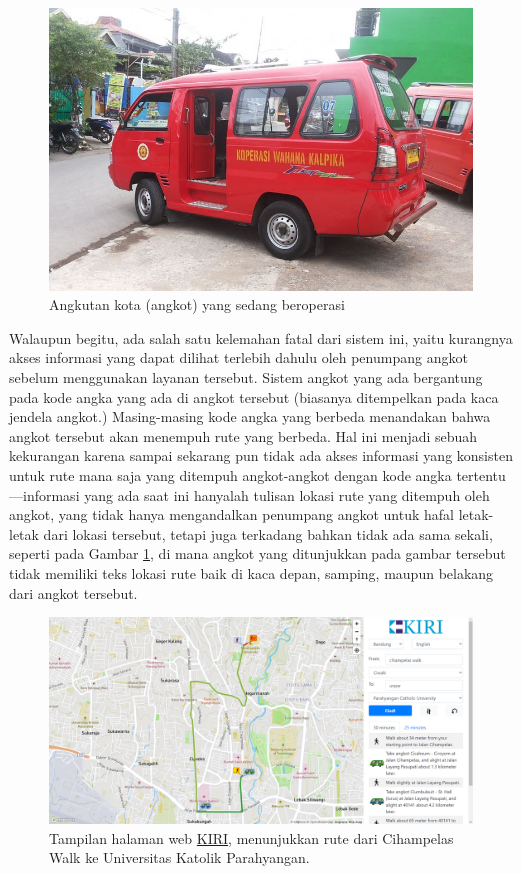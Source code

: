 \documentclass[a4paper,twoside]{article}
\begin{document}
\begin{figure}[h]
	\centering
	\includegraphics[scale=0.3]{angkot}
	\caption[Angkot yang sedang beroperasi]{Angkutan kota (angkot) yang sedang beroperasi}
	\label{fig:angkot}
\end{figure}

Walaupun begitu, ada salah satu kelemahan fatal dari sistem ini, yaitu kurangnya akses informasi yang dapat dilihat terlebih dahulu oleh penumpang angkot sebelum menggunakan layanan tersebut. Sistem angkot yang ada bergantung pada kode angka yang ada di angkot tersebut (biasanya ditempelkan pada kaca jendela angkot.) Masing-masing kode angka yang berbeda menandakan bahwa angkot tersebut akan menempuh rute yang berbeda. Hal ini menjadi sebuah kekurangan karena sampai sekarang pun tidak ada akses informasi yang konsisten untuk rute mana saja yang ditempuh angkot-angkot dengan kode angka tertentu---informasi yang ada saat ini hanyalah tulisan lokasi rute yang ditempuh oleh angkot, yang tidak hanya mengandalkan penumpang angkot untuk hafal letak-letak dari lokasi tersebut, tetapi juga terkadang bahkan tidak ada sama sekali, seperti pada Gambar \ref{fig:angkot}, di mana angkot yang ditunjukkan pada gambar tersebut tidak memiliki teks lokasi rute baik di kaca depan, samping, maupun belakang dari angkot tersebut.

\begin{figure}[h]
	\centering
	\includegraphics[width=\textwidth]{projectkiri}
	\caption[Tampilan halaman web KIRI]{Tampilan halaman web \href{https://projectkiri.id}{KIRI}, menunjukkan rute dari Cihampelas Walk ke Universitas Katolik Parahyangan.}
	\label{fig:kiripage}
\end{figure}
\end{document}
